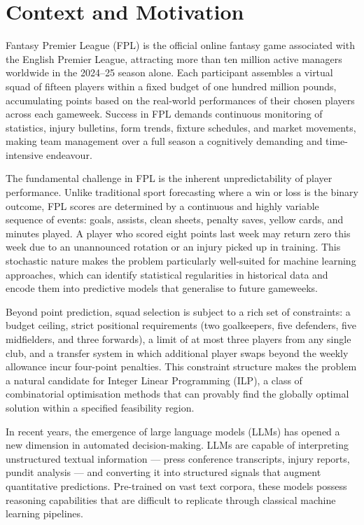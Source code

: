 
\section{Context and Motivation}

Fantasy Premier League (FPL) is the official online fantasy game associated with the English Premier League, attracting more than ten million active managers worldwide in the 2024--25 season alone. Each participant assembles a virtual squad of fifteen players within a fixed budget of one hundred million pounds, accumulating points based on the real-world performances of their chosen players across each gameweek. Success in FPL demands continuous monitoring of statistics, injury bulletins, form trends, fixture schedules, and market movements, making team management over a full season a cognitively demanding and time-intensive endeavour.

The fundamental challenge in FPL is the inherent unpredictability of player performance. Unlike traditional sport forecasting where a win or loss is the binary outcome, FPL scores are determined by a continuous and highly variable sequence of events: goals, assists, clean sheets, penalty saves, yellow cards, and minutes played. A player who scored eight points last week may return zero this week due to an unannounced rotation or an injury picked up in training. This stochastic nature makes the problem particularly well-suited for machine learning approaches, which can identify statistical regularities in historical data and encode them into predictive models that generalise to future gameweeks.

Beyond point prediction, squad selection is subject to a rich set of constraints: a budget ceiling, strict positional requirements (two goalkeepers, five defenders, five midfielders, and three forwards), a limit of at most three players from any single club, and a transfer system in which additional player swaps beyond the weekly allowance incur four-point penalties. This constraint structure makes the problem a natural candidate for Integer Linear Programming (ILP), a class of combinatorial optimisation methods that can provably find the globally optimal solution within a specified feasibility region.

In recent years, the emergence of large language models (LLMs) has opened a new dimension in automated decision-making. LLMs are capable of interpreting unstructured textual information — press conference transcripts, injury reports, pundit analysis — and converting it into structured signals that augment quantitative predictions. Pre-trained on vast text corpora, these models possess reasoning capabilities that are difficult to replicate through classical machine learning pipelines.


